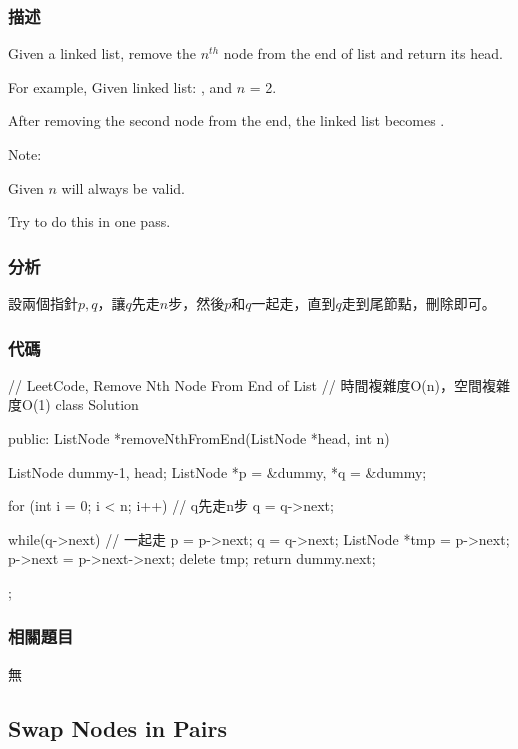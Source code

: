 \subsubsection{描述}
Given a linked list, remove the $n^{th}$ node from the end of list and return its head.

For example, Given linked list: , and $n$ = 2.

After removing the second node from the end, the linked list becomes .

Note:
\begindot
\item Given $n$ will always be valid.
\item Try to do this in one pass.
\myenddot


\subsubsection{分析}
設兩個指針$p,q$，讓$q$先走$n$步，然後$p$和$q$一起走，直到$q$走到尾節點，刪除即可。


\subsubsection{代碼}
\begin{Code}
// LeetCode, Remove Nth Node From End of List
// 時間複雜度O(n)，空間複雜度O(1)
class Solution {
public:
    ListNode *removeNthFromEnd(ListNode *head, int n) {
        ListNode dummy{-1, head};
        ListNode *p = &dummy, *q = &dummy;

        for (int i = 0; i < n; i++)  // q先走n步
            q = q->next;

        while(q->next) { // 一起走
            p = p->next;
            q = q->next;
        }
        ListNode *tmp = p->next;
        p->next = p->next->next;
        delete tmp;
        return dummy.next;
    }
};
\end{Code}


\subsubsection{相關題目}

\begindot
\item 無
\myenddot


\subsection{Swap Nodes in Pairs}
\label{sec:swap-nodes-in-pairs}


